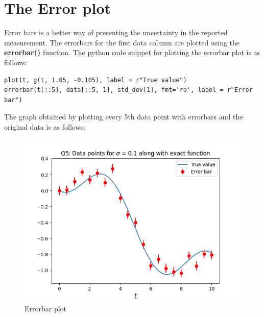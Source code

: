 \documentclass[11pt, a4paper]{article}
\begin{document}
\section{The Error plot}
Error bars is a better way of presenting the uncertainty in the reported measurement. The errorbars for the first data column are plotted using the \textbf{errorbar()} function. The python code snippet for plotting the errorbar plot is as follows:
\begin{verbatim}	
plot(t, g(t, 1.05, -0.105), label = r"True value")
errorbar(t[::5], data[::5, 1], std_dev[1], fmt='ro', label = r"Error bar") 
\end{verbatim}
 The graph obtained by plotting every 5th data point with errorbars and the original data is as follows:   
	\begin{figure}[!tbh]
   	\centering
   	\includegraphics[scale=0.6]{Figure_Q5.png}   
   	\caption{Errorbar plot}
   	\label{fig:sample}
   \end{figure} 
  
\end{document}
